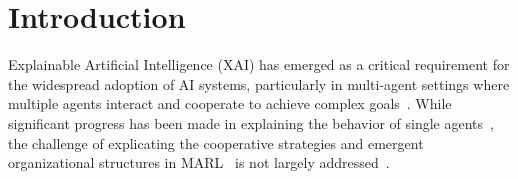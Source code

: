 \documentclass[runningheads]{llncs}
\begin{document}





\section{Introduction}

Explainable Artificial Intelligence (XAI) has emerged as a critical requirement for the widespread adoption of AI systems, particularly in multi-agent settings where multiple agents interact and cooperate to achieve complex goals~\cite{doshivelez2017rigorous,gunning2019xai}. While significant progress has been made in explaining the behavior of single agents~\cite{ribeiro2016classifier,lundberg2017unified}, the challenge of explicating the cooperative strategies and emergent organizational structures in MARL~\cite{busoniu2008survey} is not largely addressed~\cite{kok2006collaborative,omidshafiei2019learning}.
\end{document}
